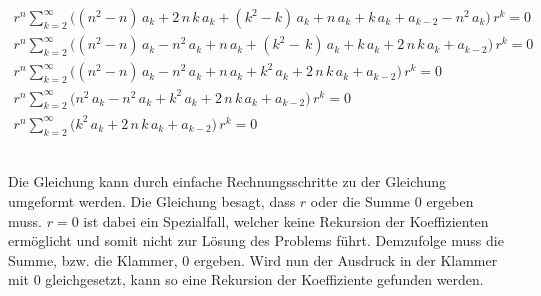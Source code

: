 \begin{align}
	\nonumber
	r^n
	\sum_{k=2}^{\infty}
	\biggl(
	\left( n^2 - n \right) \, a_k 
	+
	2 \, n \, k \, a_k
	+
	\left( k^2 - k \right) \, a_k
	+
	n \, a_k
	+
	k \, a_k
	+
	a_{k - 2}
	-
	n^2 \, a_k
	\biggr)
	\, r^k
	= 0 
	\\
	\nonumber
	r^n
	\sum_{k=2}^{\infty}
	\biggl(
	\left( n^2 - n \right) \, a_k 
	-
	n^2 \, a_k
	+
	n \, a_k
	+
	\left( k^2 - \, k \right) \, a_k
	+
	k \, a_k
	+
	2 \, n \, k \, a_k
	+
	a_{k - 2}
	\biggr)
	\, r^k
	= 0 
	\\
	\nonumber
	r^n
	\sum_{k=2}^{\infty}
	\biggl(
	\left( n^2 - n \right) \, a_k 
	-
	n^2 \, a_k
	+
	n \, a_k
	+
	k^2 \, a_k
	+
	2 \, n \, k \, a_k
	+
	a_{k - 2}
	\biggr)
	\, r^k
	= 0 
	\\
	\nonumber
	r^n
	\sum_{k=2}^{\infty}
	\biggl(
	n^2 \, a_k 
	-
	n^2 \, a_k
	+
	k^2 \, a_k
	+
	2 \, n \, k \, a_k
	+
	a_{k - 2}
	\biggr)
	\, r^k
	= 0 
	\\
	r^n
	\sum_{k=2}^{\infty}
	\biggl(
	k^2 \, a_k
	+
	2 \, n \, k \, a_k
	+
	a_{k - 2}
	\biggr)
	\, r^k
	= 0
	\label{eq:bessel:summe:zusammengefasst:vereinfacht}
\end{align}
\\
\begin{normalsize}
	Die Gleichung  kann durch einfache Rechnungsschritte zu der Gleichung  umgeformt werden.
	Die Gleichung  besagt,
	dass $r$ oder die Summe $0$ ergeben muss.
	$r = 0$ ist dabei ein Spezialfall, welcher keine Rekursion der Koeffizienten erm\"oglicht und somit nicht zur L\"osung des Problems f\"uhrt.
	Demzufolge muss die Summe, \acs{bzw.} die Klammer, $0$ ergeben.
	Wird nun der Ausdruck in der Klammer mit $0$ gleichgesetzt,
	kann so eine Rekursion der Koeffiziente gefunden werden.
\end{normalsize}

